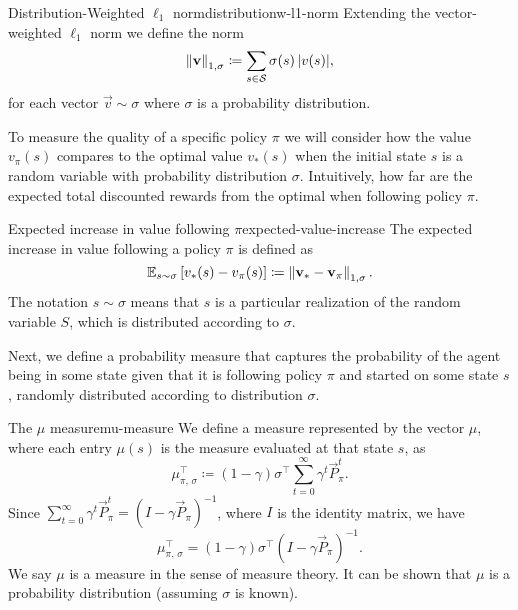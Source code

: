 \begin{dfn}{Distribution-Weighted $\ell_1$ norm}{distributionw-l1-norm}
    Extending the vector-weighted $\ell_1$ norm we define the norm
    \[
        \left\| \mathbf{v} \right\|_{1, \sigma} \coloneqq \sum_{s \in \mathcal{S}} \sigma(s) \, |v(s)|,
    \]
    for each vector $\vec{v} \sim \sigma$ where $\sigma$ is a probability
    distribution.
\end{dfn}

To measure the quality of a specific policy $\pi$ we will consider how the
value $v_\pi(s)$ compares to the optimal value $v_* (s)$ when the initial state
$s$ is a random variable with probability distribution $\sigma$. Intuitively,
how far are the expected total discounted rewards from the optimal when
following policy $\pi$.

\begin{dfn}{Expected increase in value following $\pi$}{expected-value-increase}
    The expected increase in value following a policy $\pi$ is defined as
    \begin{equation}
        \label{eq:expected-value-increase}
        \mathbb{E}_{s \sim \sigma} \left[ v_* (s) - v_\pi (s) \right] \coloneqq \left\| \mathbf{v
        }_* - \mathbf{v}_\pi \right\|_{1, \sigma}.
    \end{equation}
    The notation $s \sim \sigma$ means that $s$ is a particular realization of the
    random variable $S$, which is distributed according to $\sigma$.
\end{dfn}

Next, we define a probability measure that captures the probability of the agent
being in some state given that it is following policy $\pi$ and started on some
state $s$, randomly distributed according to distribution $\sigma$.

\begin{dfn}{The $\mu$ measure}{mu-measure}
    We define a measure represented by the vector $\mu$, where each entry
    $\mu(s)$ is the measure evaluated at that state $s$, as
    \[
        \mu_{\pi, \, \sigma}^{\top} \coloneqq (1 - \gamma) \sigma^{\top} \sum_{t=0}^{\infty} \gamma^{t} \vec{P}_{\pi}^{t}.
    \]
    Since $\sum_{t=0}^{\infty} \gamma^{t} \vec{P}_{\pi}^{t} = (I - \gamma
    \vec{P}_\pi)^{-1}$, where $I$ is the identity matrix, we have
    \[
        \mu_{\pi, \, \sigma}^{\top} = (1 - \gamma) \sigma^{\top} (I - \gamma \vec{P}_{\pi})^{-1}.
    \]
    We say $\mu$ is a measure in the sense of measure theory. It can be shown
    \Cite[pg.~864]{farias2003LP2ADP} that $\mu$ is a probability distribution
    (assuming $\sigma$ is known).
\end{dfn}


